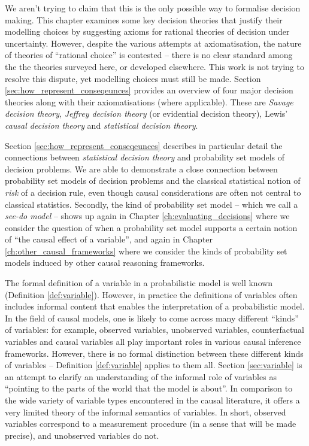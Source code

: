 We aren't trying to claim that this is the only possible way to formalise decision making. This chapter examines some key decision theories that justify their modelling choices by suggesting axioms for rational theories of decision under uncertainty. However, despite the various attempts at axiomatisation, the nature of theories of ``rational choice'' is contested -- there is no clear standard among the the theories surveyed here, or developed elsewhere. This work is not trying to resolve this dispute, yet modelling choices must still be made. Section \ref{sec:how_represent_conseqeunces} provides an overview of four major decision theories along with their axiomatisations (where applicable). These are \emph{Savage decision theory}, \emph{Jeffrey decision theory} (or evidential decision theory), Lewis' \emph{causal decision theory} and \emph{statistical decision theory}.

Section \ref{sec:how_represent_conseqeunces} describes in particular detail the connections between \emph{statistical decision theory} \citep{wald_statistical_1950} and probability set models of decision problems. We are able to demonstrate a close connection between probability set models of decision problems and the classical statistical notion of \emph{risk} of a decision rule, even though causal considerations are often not central to classical statistics. Secondly, the kind of probability set model -- which we call a \emph{see-do model} -- shows up again in Chapter \ref{ch:evaluating_decisions} where we consider the question of when a probability set model supports a certain notion of ``the causal effect of a variable'', and again in Chapter \ref{ch:other_causal_frameworks} where we consider the kinds of probability set models induced by other causal reasoning frameworks.

The formal definition of a variable in a probabilistic model is well known (Definition \ref{def:variable}). However, in practice the definitions of variables often includes informal content that enables the interpretation of a probabilistic model. In the field of causal models, one is likely to come across many different ``kinds'' of variables: for example, observed variables, unobserved variables, counterfactual variables and causal variables all play important roles in various causal inference frameworks. However, there is no formal distinction between these different kinds of variables -- Definition \ref{def:variable} applies to them all. Section \ref{sec:variable} is an attempt to clarify an understanding of the informal role of variables as ``pointing to the parts of the world that the model is about''. In comparison to the wide variety of variable types encountered in the causal literature, it offers a very limited theory of the informal semantics of variables. In short, observed variables correspond to a measurement procedure (in a sense that will be made precise), and unobserved variables do not.

